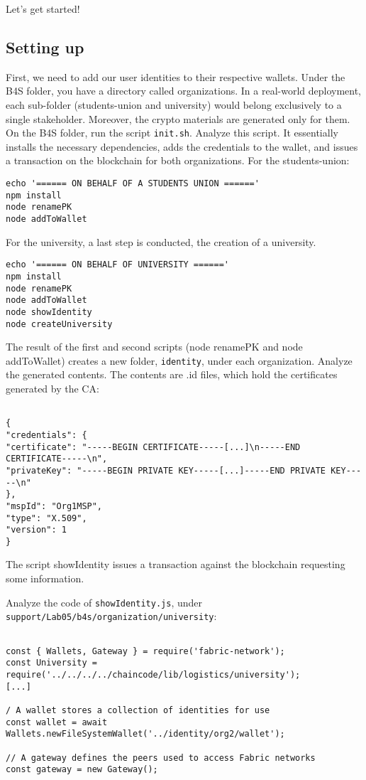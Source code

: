 \documentclass[12pt,a4paper]{article}
\theoremstyle{definition}
\begin{document}
Let's get started!

\subsection{Setting up}
First, we need to add our user identities to their respective wallets. Under the B4S folder, you have a directory called organizations. In a real-world deployment, each sub-folder (students-union and university) would belong exclusively to a single stakeholder. Moreover, the crypto materials are generated only for them. On the B4S folder, run the script \texttt{init.sh}. Analyze this script. It essentially installs the necessary dependencies, adds the credentials to the wallet, and issues a transaction on the blockchain for both organizations. For the students-union:

\begin{verbatim}
echo '====== ON BEHALF OF A STUDENTS UNION ======'
npm install
node renamePK
node addToWallet
\end{verbatim}

For the university, a last step is conducted, the creation of a university.
\begin{verbatim}
echo '====== ON BEHALF OF UNIVERSITY ======'
npm install
node renamePK
node addToWallet
node showIdentity
node createUniversity
\end{verbatim}


The result of the first and second scripts (node renamePK and node addToWallet) creates a new folder, \texttt{identity}, under each organization. Analyze the generated contents. The contents are .id files, which hold the certificates generated by the CA:

\begin{verbatim}

{
"credentials": {
"certificate": "-----BEGIN CERTIFICATE-----[...]\n-----END CERTIFICATE-----\n",
"privateKey": "-----BEGIN PRIVATE KEY-----[...]-----END PRIVATE KEY-----\n"
},
"mspId": "Org1MSP",
"type": "X.509",
"version": 1
}
\end{verbatim}

The script showIdentity issues a transaction against the blockchain requesting some information.

Analyze the code of \texttt{showIdentity.js}, under \texttt{support/Lab05/b4s/organization/university}:

\begin{verbatim}

const { Wallets, Gateway } = require('fabric-network');
const University = require('../../../../chaincode/lib/logistics/university');
[...]

/ A wallet stores a collection of identities for use
const wallet = await Wallets.newFileSystemWallet('../identity/org2/wallet');

// A gateway defines the peers used to access Fabric networks
const gateway = new Gateway();
\end{verbatim}
\end{document}
